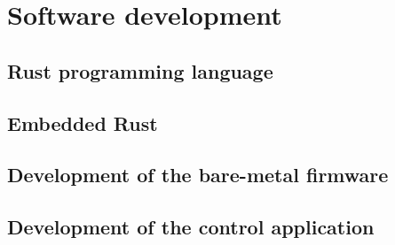 \section{Software development}
\label{sec:software}

\subsection{Rust programming language}
\subsection{Embedded Rust}
\subsection{Development of the bare-metal firmware}
\subsection{Development of the control application}